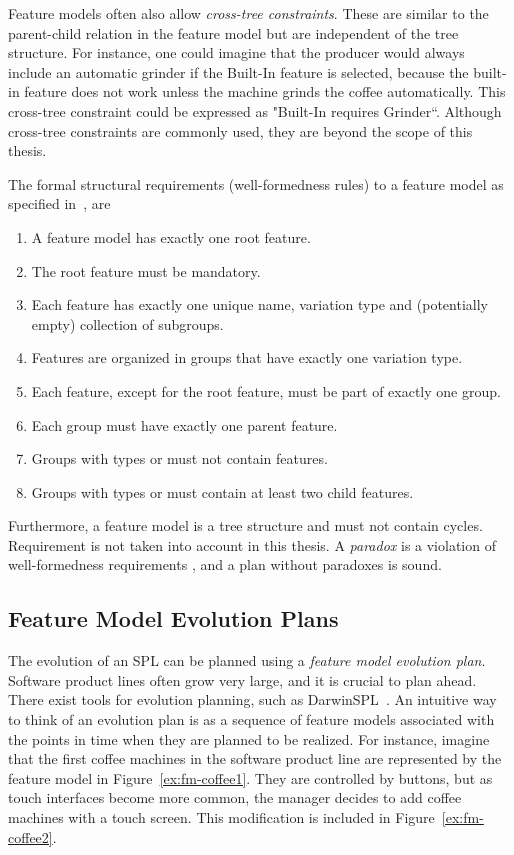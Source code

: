 Feature models often also allow \emph{cross-tree constraints}. These are similar to the parent-child relation in the feature model but are independent of the tree structure. For instance, one could imagine that the producer would always include an automatic grinder if the Built-In feature is selected, because the built-in feature does not work unless the machine grinds the coffee automatically. This cross-tree constraint could be expressed as "Built-In requires Grinder``. Although cross-tree constraints are commonly used, they are beyond the scope of this thesis.

The formal structural requirements (well-formedness rules) to a feature model as specified in~\cite{art:consistency-preserving-evolution-planning}, are 
\begin{enumerate}[\itbf{WF\arabic*}, itemsep=0mm]
   \label{wf-requirements}
   \item A feature model has exactly one root feature.
   \item The root feature must be mandatory.
   \item Each feature has exactly one unique name, variation type and (potentially empty) collection of subgroups.
   \item Features are organized in groups that have exactly one variation type.
   \item Each feature, except for the root feature, must be part of exactly one group.
   \item Each group must have exactly one parent feature.
   \item Groups with types \xortype{} or \ortype{} must not contain \mandatory{} features.
   \item Groups with types \xortype{} or \ortype{} must contain at least two child features.
\end{enumerate}

Furthermore, a feature model is a tree structure and must not contain cycles. Requirement  is not taken into account in this thesis. A \emph{paradox} is a violation of well-formedness requirements , and a plan without paradoxes is sound.

\subsection{Feature Model Evolution Plans}
\label{sub:feature-model-evolution-plans}
The evolution of an SPL can be planned using a \emph{feature model evolution plan}. Software product lines often grow very large, and it is crucial to plan ahead. 
There exist tools for evolution planning, such as DarwinSPL~\cite{art:darwinspl-an-integrated-tool-suite-for-modeling-evolving-context-aware-software-product-lines}. An intuitive way to think of an evolution plan is as a sequence of feature models associated with the points in time when they are planned to be realized. For instance, imagine that the first coffee machines in the software product line are represented by the feature model in Figure~\vref{ex:fm-coffee1}. They are controlled by buttons, but as touch interfaces become more common, the manager decides to add coffee machines with a touch screen. This modification is included in Figure~\vref{ex:fm-coffee2}.


